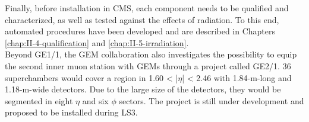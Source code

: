     Finally, before installation in CMS, each component needs to be qualified and characterized, as well as tested against the effects of radiation. To this end, automated procedures have been developed and are described in Chapters \ref{chap:II-4-qualification} and \ref{chap:II-5-irradiation}. \\

    Beyond GE1/1, the GEM collaboration also investigates the possibility to equip the second inner muon station with GEMs through a project called GE2/1. 36 superchambers would cover a region in 1.60 < |$\eta$| < 2.46 with 1.84-m-long and 1.18-m-wide detectors. Due to the large size of the detectors, they would be segmented in eight $ \eta $ and six $ \phi $ sectors. The project is still under development and proposed to be installed during LS3.
